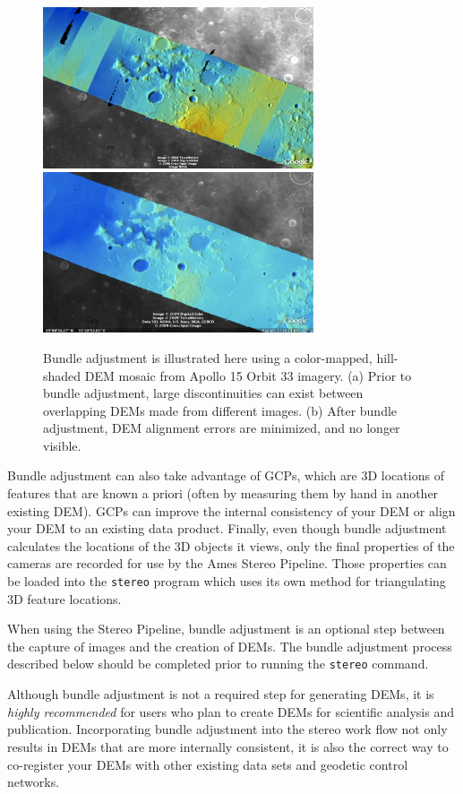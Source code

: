 \begin{figure}[bt]
  \centering
  \includegraphics[width=8cm]{images/ba_orig}
  \includegraphics[width=8cm]{images/ba_adjusted}
  \caption{Bundle adjustment is illustrated here using a color-mapped,
    hill-shaded DEM mosaic from Apollo 15 Orbit 33 imagery. (a)
    Prior to bundle adjustment, large discontinuities can exist between
    overlapping DEMs made from different images. (b) After bundle
    adjustment, DEM alignment errors are minimized, and no longer visible.}
  \label{fig:bundle_adjustment}
\end{figure}

Bundle adjustment can also take advantage of \acp{GCP}, which are
3D locations of features that are known a priori (often by measuring
them by hand in another existing \ac{DEM}). \acp{GCP} can improve the internal
consistency of your \ac{DEM} or align your \ac{DEM} to an existing data
product. Finally, even though bundle adjustment calculates the
locations of the 3D objects it views, only the final properties of
the cameras are recorded for use by the Ames Stereo Pipeline. Those
properties can be loaded into the \texttt{stereo} program which
uses its own method for triangulating 3D feature locations.

When using the Stereo Pipeline, bundle adjustment is an optional step
between the capture of images and the creation of \acp{DEM}. The bundle
adjustment process described below should be completed prior to
running the \texttt{stereo} command.

Although bundle adjustment is not a required step for generating
\acp{DEM}, it is {\em highly recommended} for users who plan to
create \acp{DEM} for scientific analysis and publication.  Incorporating
bundle adjustment into the stereo work flow not only results in
\acp{DEM} that are more internally consistent, it is also the correct
way to co-register your \acp{DEM} with other existing data sets and
geodetic control networks.

